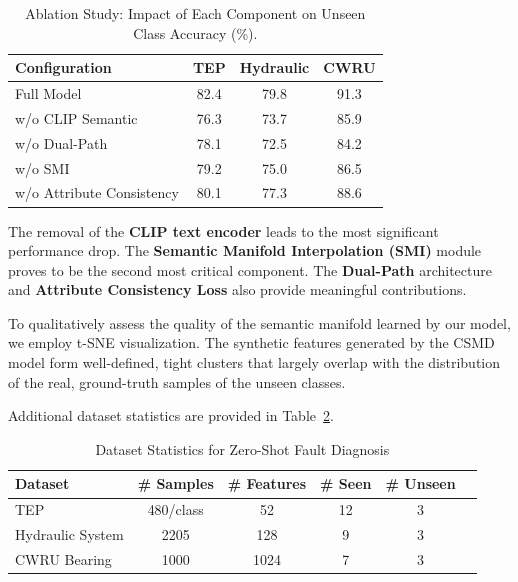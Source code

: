 \documentclass[journal,12pt,onecolumn]{IEEEtran}
\begin{document}
\begin{table}[htbp]
\centering
\caption{Ablation Study: Impact of Each Component on Unseen Class Accuracy (\%).}
\label{tab:ablation}
\begin{tabular}{lccc}
\toprule
Configuration & TEP & Hydraulic & CWRU \\
\midrule
Full Model & 82.4 & 79.8 & 91.3 \\
w/o CLIP Semantic & 76.3 & 73.7 & 85.9 \\
w/o Dual-Path & 78.1 & 72.5 & 84.2 \\
w/o SMI & 79.2 & 75.0 & 86.5 \\
w/o Attribute Consistency & 80.1 & 77.3 & 88.6 \\
\bottomrule
\end{tabular}
\end{table}

The removal of the \textbf{CLIP text encoder} leads to the most significant performance drop. The \textbf{Semantic Manifold Interpolation (SMI)} module proves to be the second most critical component. The \textbf{Dual-Path} architecture and \textbf{Attribute Consistency Loss} also provide meaningful contributions.

To qualitatively assess the quality of the semantic manifold learned by our model, we employ t-SNE visualization. The synthetic features generated by the CSMD model form well-defined, tight clusters that largely overlap with the distribution of the real, ground-truth samples of the unseen classes.

Additional dataset statistics are provided in Table~\ref{tab:datasets}.

\begin{table}[htbp]
\centering
\caption{Dataset Statistics for Zero-Shot Fault Diagnosis}
\label{tab:datasets}
\begin{tabular}{lccccc}
\toprule
Dataset & \# Samples & \# Features & \# Seen & \# Unseen \\
\midrule
TEP & 480/class & 52 & 12 & 3 \\
Hydraulic System & 2205 & 128 & 9 & 3 \\
CWRU Bearing & 1000 & 1024 & 7 & 3 \\
\bottomrule
\end{tabular}
\end{table}
\end{document}
